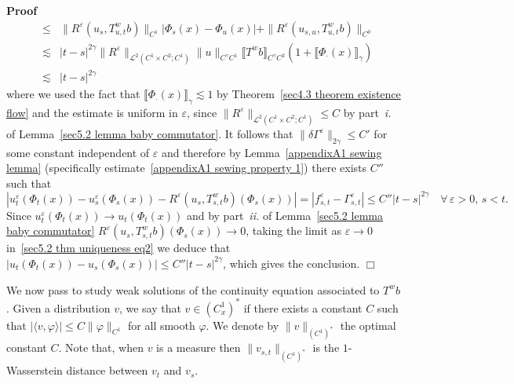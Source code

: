 \documentclass[10pt]{article}
\newcommand{\tmtextit}[1]{{\itshape{#1}}}
\newenvironment{proof}{\noindent\textbf{Proof\ }}{\hspace*{\fill}$\Box$\medskip}
\begin{document}
\begin{proof}
\begin{eqnarray*}
    & \leqslant & \| R^{\varepsilon} (u_s, T^w_{u, t} b) \|_{C^1} | \Phi_s
    (x) - \Phi_u (x) | + \| R^{\varepsilon} (u_{s, u}, T^w_{u, t} b)
    \|_{C^0}\\
    & \lesssim & | t - s |^{2 \gamma} \| R^{\varepsilon} \|_{\mathcal{L}^2
    (C^1 \times C^2 ; C^1)} \| u \|_{C^{\gamma} C^1} \llbracket T^w b
    \rrbracket_{C^{\gamma} C^2} (1 + \llbracket \Phi_{\cdot} (x)
    \rrbracket_{\gamma})\\
    & \lesssim & | t - s |^{2 \gamma}
  \end{eqnarray*}
  where we used the fact that $\llbracket \Phi_{\cdot} (x) \rrbracket_{\gamma}
  \lesssim 1$ by Theorem~\ref{sec4.3 theorem existence flow} and the estimate
  is uniform in $\varepsilon$, since $\| R^{\varepsilon} \|_{\mathcal{L}^2
  (C^1 \times C^2 ; C^1)} \leqslant C$ by part~\tmtextit{i.} of
  Lemma~\ref{sec5.2 lemma baby commutator}. It follows that $\| \delta
  \Gamma^{\varepsilon} \|_{2 \gamma} \leqslant C'$ for some constant
  independent of $\varepsilon$ and therefore by Lemma~\ref{appendixA1 sewing
  lemma} (specifically estimate~{\eqref{appendixA1 sewing property 1}}) there
  exists $C''$ such that
  \begin{equation}
    | u^{\varepsilon}_t (\Phi_t (x)) - u^{\varepsilon}_s (\Phi_s (x)) -
    R^{\varepsilon} (u_s, T^w_{s, t} b) (\Phi_s (x)) | = | f^{\varepsilon}_{s,
    t} - \Gamma^{\varepsilon}_{s, t} | \leqslant C'' | t - s |^{2 \gamma}
    \quad \forall \, \varepsilon > 0, \, s < t. \label{sec5.2 thm uniqueness
    eq2}
  \end{equation}
  Since $u^{\varepsilon}_t (\Phi_t (x)) \rightarrow u_t (\Phi_t (x))$ and by
  part~\tmtextit{ii.} of Lemma~\ref{sec5.2 lemma baby commutator}
  $R^{\varepsilon} (u_s, T^w_{s, t} b) (\Phi_s (x)) \rightarrow 0$, taking the
  limit as $\varepsilon \rightarrow 0$ in~{\eqref{sec5.2 thm uniqueness eq2}}
  we deduce that $| u_t (\Phi_t (x)) - u_s (\Phi_s (x)) | \leqslant C'' | t -
  s |^{2 \gamma}$, which gives the conclusion.
\end{proof}

We now pass to study weak solutions of the continuity equation associated to
$T^w b$. Given a distribution $v$, we say that $v \in (C^1_x)^{\ast}$ if there
exists a constant $C$ such that $| \langle v, \varphi \rangle | \leqslant C \|
\varphi \|_{C^1}$ for all smooth $\varphi$. We denote by $\| v
\|_{(C^1)^{\ast}}$ the optimal constant $C$. Note that, when $v$ is a measure
then $\| v_{s, t} \|_{(C^1)^{\ast}}$ is the $1$-Wasserstein distance between
$v_t$ and $v_s$.
\end{document}
